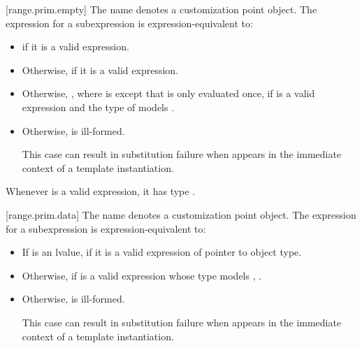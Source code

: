 [range.prim.empty]{}
\pnum
The name  denotes a customization point
object. The expression
 for a subexpression  is
expression-equivalent to:
\begin{itemize}
\item
   if it is a valid expression.

\item
  Otherwise,  if it is a valid expression.

\item
  Otherwise, , where  is
  except that  is only evaluated once,
  if  is a valid expression and
  the type of  models .

\item
  Otherwise,  is ill-formed.
  \begin{note}
  This case can result in substitution failure when 
  appears in the immediate context of a template instantiation.
  \end{note}
\end{itemize}

\pnum
\begin{note}
Whenever  is a valid expression,
it has type .
\end{note}

[range.prim.data]{}
\pnum
The name  denotes a customization point
object. The expression
 for a subexpression  is
expression-equivalent to:
\begin{itemize}
\item
  If  is an lvalue, 
  if it is a valid expression of pointer to object type.

\item
  Otherwise, if  is a valid expression whose type models
  ,
  .

\item
  Otherwise,  is ill-formed.
  \begin{note}
  This case can result in substitution failure when 
  appears in the immediate context of a template instantiation.
  \end{note}
\end{itemize}

